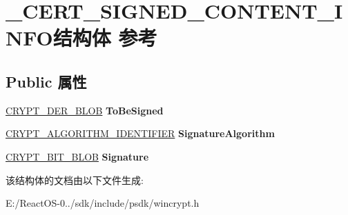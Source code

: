 \hypertarget{struct___c_e_r_t___s_i_g_n_e_d___c_o_n_t_e_n_t___i_n_f_o}{}\section{\+\_\+\+C\+E\+R\+T\+\_\+\+S\+I\+G\+N\+E\+D\+\_\+\+C\+O\+N\+T\+E\+N\+T\+\_\+\+I\+N\+F\+O结构体 参考}
\label{struct___c_e_r_t___s_i_g_n_e_d___c_o_n_t_e_n_t___i_n_f_o}
\subsection*{Public 属性}
\begin{DoxyCompactItemize}
\item 
\mbox{\label{struct___c_e_r_t___s_i_g_n_e_d___c_o_n_t_e_n_t___i_n_f_o_aea7cdc4b909abb142a3161cd1fea3c36}} 
\hyperlink{struct___c_r_y_p_t_o_a_p_i___b_l_o_b}{C\+R\+Y\+P\+T\+\_\+\+D\+E\+R\+\_\+\+B\+L\+OB} {\bfseries To\+Be\+Signed}
\item 
\mbox{\label{struct___c_e_r_t___s_i_g_n_e_d___c_o_n_t_e_n_t___i_n_f_o_a4fabc5aa47ee28b7f9978a36b4ec9f79}} 
\hyperlink{struct___c_r_y_p_t___a_l_g_o_r_i_t_h_m___i_d_e_n_t_i_f_i_e_r}{C\+R\+Y\+P\+T\+\_\+\+A\+L\+G\+O\+R\+I\+T\+H\+M\+\_\+\+I\+D\+E\+N\+T\+I\+F\+I\+ER} {\bfseries Signature\+Algorithm}
\item 
\mbox{\label{struct___c_e_r_t___s_i_g_n_e_d___c_o_n_t_e_n_t___i_n_f_o_ac0881a2164bb126e549f51c508872285}} 
\hyperlink{struct___c_r_y_p_t___b_i_t___b_l_o_b}{C\+R\+Y\+P\+T\+\_\+\+B\+I\+T\+\_\+\+B\+L\+OB} {\bfseries Signature}
\end{DoxyCompactItemize}


该结构体的文档由以下文件生成\+:\begin{DoxyCompactItemize}
\item 
E\+:/\+React\+O\+S-\/0../sdk/include/psdk/wincrypt.\+h\end{DoxyCompactItemize}
